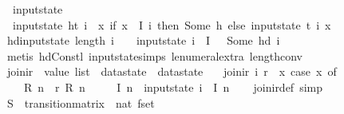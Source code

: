 \begin{isabellebody}
\ \ {\isachardoublequoteopen}input{}state\ {\isacharbrackleft}{\isacharbrackright}\ {\isacharunderscore}\ {\isacharequal}\ {\isacharless}{\isachargreater}{\isachardoublequoteclose}\ {\isacharbar}\isanewline
\ \ {\isachardoublequoteopen}input{}state\ {\isacharparenleft}h{\isacharhash}t{\isacharparenright}\ i\ {\isacharequal}\ {\isacharparenleft}{\isasymlambda}x{\isachardot}\ if\ x\ {\isacharequal}\ I\ i\ then\ Some\ h\ else\ {\isacharparenleft}input{}state\ t\ {\isacharparenleft}i{\isacharplus}{}{\isacharparenright}{\isacharparenright}\ x{\isacharparenright}{\isachardoublequoteclose}\isanewline
\isanewline
{}\isamarkupfalse%
\ hd{\isacharunderscore}input{}state{\isacharcolon}\ {\isachardoublequoteopen}length\ i\ {\isasymge}\ {}\ {\isasymLongrightarrow}\ input{}state\ i\ {}\ {\isacharparenleft}I\ {}{\isacharparenright}\ {\isacharequal}\ Some\ {\isacharparenleft}hd\ i{\isacharparenright}{\isachardoublequoteclose}\isanewline
%
\isadelimproof
\ \ %
\endisadelimproof
%
\isatagproof
{}\isamarkupfalse%
\ {\isacharparenleft}metis\ hd{\isacharunderscore}Cons{\isacharunderscore}tl\ input{}state{\isachardot}simps{\isacharparenleft}{}{\isacharparenright}\ le{\isacharunderscore}numeral{\isacharunderscore}extra{\isacharparenleft}{}{\isacharparenright}\ length{\isacharunderscore}{}{\isacharunderscore}conv{\isacharparenright}%
\endisatagproof
{\isafoldproof}%
%
\isadelimproof
\isanewline
%
\endisadelimproof
\isanewline
{}\isamarkupfalse%
\ join{\isacharunderscore}ir\ {\isacharcolon}{\isacharcolon}\ {\isachardoublequoteopen}value\ list\ {\isasymRightarrow}\ datastate\ {\isasymRightarrow}\ datastate{\isachardoublequoteclose}\ \isanewline
\ \ {\isachardoublequoteopen}join{\isacharunderscore}ir\ i\ r\ {\isasymequiv}\ {\isacharparenleft}{\isasymlambda}x{\isachardot}\ case\ x\ of\isanewline
\ \ \ \ R\ n\ {\isasymRightarrow}\ r\ {\isacharparenleft}R\ n{\isacharparenright}\ {\isacharbar}\isanewline
\ \ \ \ I\ n\ {\isasymRightarrow}\ {\isacharparenleft}input{}state\ i\ {}{\isacharparenright}\ {\isacharparenleft}I\ n{\isacharparenright}\isanewline
\ \ {\isacharparenright}{\isachardoublequoteclose}\isanewline
{}\isamarkupfalse%
\ join{\isacharunderscore}ir{\isacharunderscore}def\ {\isacharbrackleft}simp{\isacharbrackright}\isanewline
\isanewline
{}\isamarkupfalse%
\ S\ {\isacharcolon}{\isacharcolon}\ {\isachardoublequoteopen}transition{\isacharunderscore}matrix\ {\isasymRightarrow}\ nat\ fset{\isachardoublequoteclose}\ \isanewline

\end{isabellebody}
